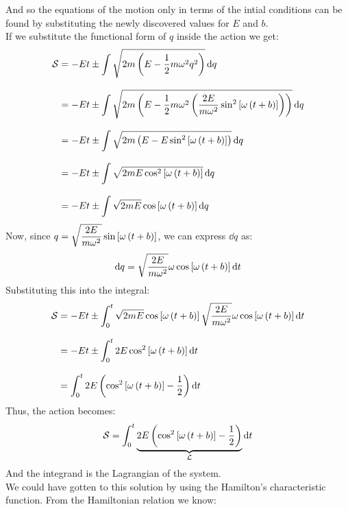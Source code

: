 And so the equations of the motion only in terms of the intial conditions can be found by substituting the newly discovered values for $E$ and $b$.\\
If we substitute the functional form of $q$ inside the action we get:
\begin{equation}
  \begin{split}
    \mathcal{S} &= -Et \pm \int \sqrt{2m\left(E - \dfrac{1}{2}m\omega^2q^2\right)} \dd{q}\\[8pt]
    &= -Et \pm \int \sqrt{2m\left(E - \dfrac{1}{2}m\omega^2\left(\dfrac{2E}{m\omega^2} \sin^2 \left[\omega\left( t + b\right)\right]\right)\right)} \dd{q}\\[8pt]
    &= -Et \pm \int \sqrt{2m\left(E - E \sin^2 \left[\omega\left( t + b\right)\right]\right)} \dd{q}\\[8pt]
    &= -Et \pm \int \sqrt{2mE \cos^2 \left[\omega\left( t + b\right)\right]} \dd{q}\\[8pt]
    &= -Et \pm \int \sqrt{2mE} \cos \left[\omega\left( t + b\right)\right] \dd{q}
  \end{split}
\end{equation}
Now, since $q = \sqrt{\dfrac{2E}{m\omega^2}} \sin \left[\omega\left( t + b\right)\right]$, we can express $\dd{q}$ as:
\begin{equation}
  \dd{q} = \sqrt{\dfrac{2E}{m\omega^2}} \omega \cos \left[\omega\left( t + b\right)\right] \dd{t}
\end{equation}
Substituting this into the integral:
\begin{equation}
  \begin{split}
    \mathcal{S} &= -Et \pm \int_0^t \sqrt{2mE} \cos \left[\omega\left( t + b\right)\right] \sqrt{\dfrac{2E}{m\omega^2}} \omega \cos \left[\omega\left( t + b\right)\right] \dd{t}\\[8pt]
    &= -Et \pm \int_0^t 2E \cos^2 \left[\omega\left( t + b\right)\right] \dd{t}\\[8pt]
    &= \int_0^t 2E\left(\cos^2 \left[\omega\left( t + b\right)\right]-\dfrac{1}{2}\right) \dd{t}
  \end{split}
\end{equation}
Thus, the action becomes:
\begin{equation}
  \mathcal{S} = \int_0^t \underbrace{2E\left(\cos^2 \left[\omega\left( t + b\right)\right]-\dfrac{1}{2}\right)}_{\mathcal{L}} \dd{t}
\end{equation}
And the integrand is the Lagrangian of the system.\\
We could have gotten to this solution by using the Hamilton's characteristic function. From the Hamiltonian relation we know:

